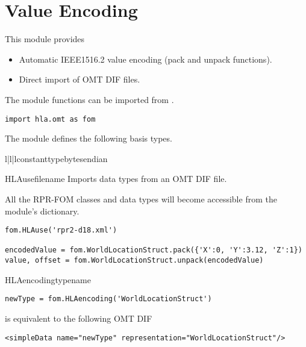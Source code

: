 \section{Value Encoding}

This module provides
\begin{itemize}
\item Automatic IEEE1516.2 value encoding (pack and unpack functions).
\item Direct import of OMT DIF files.
\end{itemize}

The module functions can be imported from .
\begin{verbatim}
import hla.omt as fom
\end{verbatim}

The module defines the following basis types.
\begin{tableiii}{l|l|l}{constant}{type}{bytes}{endian}
\end{tableiii}

\begin{funcdesc}{HLAuse}{filename}
Imports data types from an OMT DIF file.

All the RPR-FOM classes and data types will become accessible from the
module's dictionary.

\begin{verbatim}
fom.HLAuse('rpr2-d18.xml')

encodedValue = fom.WorldLocationStruct.pack({'X':0, 'Y':3.12, 'Z':1})
value, offset = fom.WorldLocationStruct.unpack(encodedValue)
\end{verbatim}

\end{funcdesc}

\begin{classdesc}{HLAencoding}{typename}
\begin{verbatim}
newType = fom.HLAencoding('WorldLocationStruct')
\end{verbatim}
is equivalent to the following OMT DIF
\begin{verbatim}
<simpleData name="newType" representation="WorldLocationStruct"/>
\end{verbatim}
\end{classdesc}

